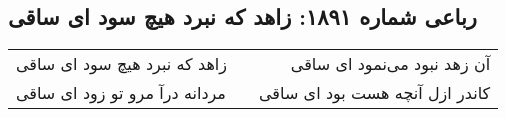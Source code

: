 \begin{center}
\section*{رباعی شماره ۱۸۹۱: زاهد که نبرد هیچ سود ای ساقی}
\label{sec:1891}
\begin{longtable}{l p{0.5cm} r}
زاهد که نبرد هیچ سود ای ساقی
&&
آن زهد نبود می‌نمود ای ساقی
\\
مردانه درآ مرو تو زود ای ساقی
&&
کاندر ازل آنچه هست بود ای ساقی
\\
\end{longtable}
\end{center}
